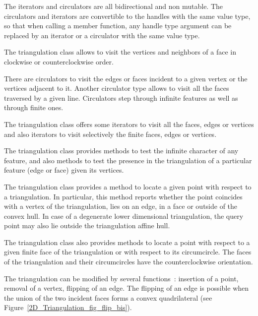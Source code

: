 The iterators and circulators
are all bidirectional and non mutable.
The circulators and iterators are convertible to the 
handles with the same value type, so that 
when calling a member function,
any handle type argument can be replaced
by an iterator or a circulator
with the same value type.

The triangulation class allows to visit the vertices
and  neighbors of a face in clockwise or counterclockwise order. 

There are circulators  
to visit the edges or faces 
incident to a given vertex or the  vertices 
adjacent to it.
Another circulator type allows to visit all the faces
traversed by a given line.
Circulators step through infinite features as well as 
through finite ones. 

The triangulation class offers 
some iterators to visit all the 
faces, edges or vertices and also iterators to visit 
selectively the finite
faces, edges  or vertices.



The triangulation class provides methods to test
the infinite character of any feature,
and also methods to test the presence in the triangulation
of a particular feature (edge or face) given its vertices.

The triangulation class  provides a method to locate
a given point with respect to a triangulation.
In particular, this method reports whether the point
coincides with a vertex of the triangulation, lies on an edge,
in a face or outside of the convex hull. In case of a degenerate 
lower dimensional triangulation, the query point may also lie
outside the triangulation affine hull.

The triangulation class also provides
methods to locate a point with respect to
a given  finite face of the triangulation or with respect to its
circumcircle.
The faces of the triangulation and their circumcircles 
have the  counterclockwise orientation.

The triangulation can be modified by several functions~:
insertion of a point, removal of a vertex,
flipping  of an edge. The flipping of an edge
is possible when the union of the two incident faces
forms  a convex quadrilateral (see Figure~\ref{2D_Triangulation_fig_flip_bis}). 

